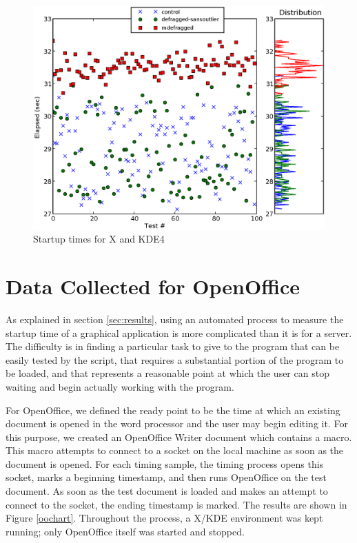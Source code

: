 \documentclass[10pt,twocolumn,letterpaper]{article}
\begin{document}
\begin{figure}[!htb]
\includegraphics[scale=0.75]{kde4-chart.eps}
\caption{Startup times for X and KDE4}
\label{kde4chart}
\end{figure}

\section{Data Collected for OpenOffice}

As explained in section \ref{sec:results}, using an automated process to measure the startup time of a graphical application is more complicated than it is for a server. The difficulty is in finding a particular task to give to the program that can be easily tested by the script, that requires a substantial portion of the program to be loaded, and that represents a reasonable point at which the user can stop waiting and begin actually working with the program.

For OpenOffice, we defined the ready point to be the time at which an existing document is opened in the word processor and the user may begin editing it. For this purpose, we created an OpenOffice Writer document which contains a macro. This macro attempts to connect to a socket on the local machine as soon as the document is opened. For each timing sample, the timing process opens this socket, marks a beginning timestamp, and then runs OpenOffice on the test document. As soon as the test document is loaded and makes an attempt to connect to the socket, the ending timestamp is marked. The results are shown in Figure \ref{oochart}. Throughout the process, a X/KDE environment was kept running; only OpenOffice itself was started and stopped.
\end{document}
